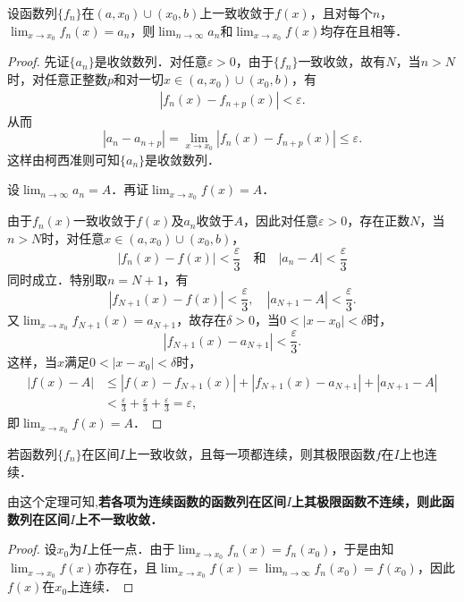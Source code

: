 \documentclass[../../main.tex]{subfiles}
\begin{document}
\begin{theorem}\label{theorem:定理13.8123}
设函数列\(\{f_n\}\)在\((a, x_0) \cup (x_0, b)\)上一致收敛于\(f(x)\)，且对每个\(n\)，\(\lim_{x \to x_0} f_n(x) = a_n\)，则\(\lim_{n \to \infty} a_n\)和\(\lim_{x \to x_0} f(x)\)均存在且相等．
\end{theorem}
\begin{proof}
先证\(\{a_n\}\)是收敛数列．对任意\(\varepsilon > 0\)，由于\(\{f_n\}\)一致收敛，故有\(N\)，当\(n > N\)时，对任意正整数\(p\)和对一切\(x \in (a, x_0) \cup (x_0, b)\)，有
\begin{align}
|f_n(x) - f_{n + p}(x)| < \varepsilon. \label{eq::--1}
\end{align}
从而
\[
|a_n - a_{n + p}| = \lim_{x \to x_0} |f_n(x) - f_{n + p}(x)| \leqslant \varepsilon.
\]
这样由柯西准则可知\(\{a_n\}\)是收敛数列．

设\(\lim_{n \to \infty} a_n = A\)．再证\(\lim_{x \to x_0} f(x) = A\)．

由于\(f_n(x)\)一致收敛于\(f(x)\)及\(a_n\)收敛于\(A\)，因此对任意\(\varepsilon > 0\)，存在正数\(N\)，当\(n > N\)时，对任意\(x \in (a, x_0) \cup (x_0, b)\)，
\[
|f_n(x) - f(x)| < \frac{\varepsilon}{3} \quad \text{和} \quad |a_n - A| < \frac{\varepsilon}{3}
\]
同时成立．特别取\(n = N + 1\)，有
\[
|f_{N + 1}(x) - f(x)| < \frac{\varepsilon}{3}, \quad |a_{N + 1} - A| < \frac{\varepsilon}{3}.
\]
又\(\lim_{x \to x_0} f_{N + 1}(x) = a_{N + 1}\)，故存在\(\delta > 0\)，当\(0 < |x - x_0| < \delta\)时，
\[
|f_{N + 1}(x) - a_{N + 1}| < \frac{\varepsilon}{3}.
\]
这样，当\(x\)满足\(0 < |x - x_0| < \delta\)时，
\begin{align*}
|f(x) - A| &\leqslant |f(x) - f_{N + 1}(x)| + |f_{N + 1}(x) - a_{N + 1}| + |a_{N + 1} - A| \\
&< \frac{\varepsilon}{3} + \frac{\varepsilon}{3} + \frac{\varepsilon}{3} = \varepsilon,
\end{align*}
即\(\lim_{x \to x_0} f(x) = A\)．
\end{proof}

\begin{theorem}[连续性]\label{theorem:定理13.98648}
若函数列\(\{f_n\}\)在区间\(I\)上一致收敛，且每一项都连续，则其极限函数\(f\)在\(I\)上也连续．
\end{theorem}
\begin{note}
由这个定理可知,\textbf{若各项为连续函数的函数列在区间\(I\)上其极限函数不连续，则此函数列在区间\(I\)上不一致收敛．}
\end{note}
\begin{proof}
设\(x_0\)为\(I\)上任一点．由于\(\lim_{x \to x_0} f_n(x) = f_n(x_0)\)，于是由知\(\lim_{x \to x_0} f(x)\)亦存在，且\(\lim_{x \to x_0} f(x) = \lim_{n \to \infty} f_n(x_0) = f(x_0)\)，因此\(f(x)\)在\(x_0\)上连续．
\end{proof}
\end{document}
